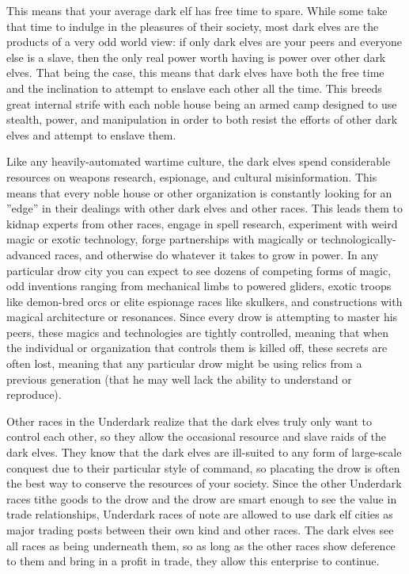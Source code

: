 This means that your average dark elf has free time to spare. While some take that time to indulge in the pleasures of their society, most dark elves are the products of a very odd world view: if only dark elves are your peers and everyone else is a slave, then the only real power worth having is power over other dark elves. That being the case, this means that dark elves have both the free time and the inclination to attempt to enslave each other all the time. This breeds great internal strife with each noble house being an armed camp designed to use stealth, power, and manipulation in order to both resist the efforts of other dark elves and attempt to enslave them.

Like any heavily-automated wartime culture, the dark elves spend considerable resources on weapons research, espionage, and cultural misinformation. This means that every noble house or other organization is constantly looking for an ''edge'' in their dealings with other dark elves and other races. This leads them to kidnap experts from other races, engage in spell research, experiment with weird magic or exotic technology, forge partnerships with magically or technologically-advanced races, and otherwise do whatever it takes to grow in power. In any particular drow city you can expect to see dozens of competing forms of magic, odd inventions ranging from mechanical limbs to powered gliders, exotic troops like demon-bred orcs or elite espionage races like skulkers, and constructions with magical architecture or resonances. Since every drow is attempting to master his peers, these magics and technologies are tightly controlled, meaning that when the individual or organization that controls them is killed off, these secrets are often lost, meaning that any particular drow might be using relics from a previous generation (that he may well lack the ability to understand or reproduce).

Other races in the Underdark realize that the dark elves truly only want to control each other, so they allow the occasional resource and slave raids of the dark elves. They know that the dark elves are ill-suited to any form of large-scale conquest due to their particular style of command, so placating the drow is often the best way to conserve the resources of your society. Since the other Underdark races tithe goods to the drow and the drow are smart enough to see the value in trade relationships, Underdark races of note are allowed to use dark elf cities as major trading posts between their own kind and other races. The dark elves see all races as being underneath them, so as long as the other races show deference to them and bring in a profit in trade, they allow this enterprise to continue.

